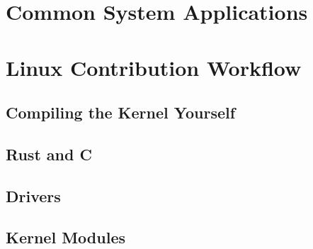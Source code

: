 \section{Common System Applications}


\section{Linux Contribution Workflow}
\subsection{Compiling the Kernel Yourself}
\subsection{Rust and C}
\subsection{Drivers}
\subsection{Kernel Modules}

